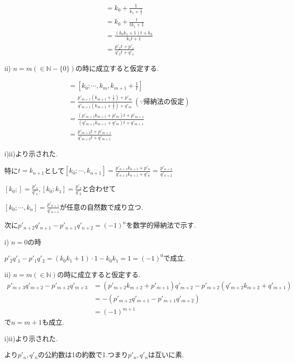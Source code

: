 \documentclass{jsarticle}
\begin{document}
       \begin{align*}
       [k_0;k_1,t]&=k_0+\frac{1}{k_1+\frac{1}{t}}\\
       &=k_0+\frac{t}{tk_1+1}\\
       &=\frac{(k_0k_1+1)t+k_0}{k_1t+1}\\
       &=\frac{p'_2t+p'_1}{q'_2t+q'_1}
       \end{align*}
       
       ii) $n=m(\in \mathbb{N}-\{0\})$の時に成立すると仮定する.
       
       \begin{align*}
       [k_0;\cdots ,k_{m+1},t]&=[k_0;\cdots ,k_{m},k_{m+1}+\frac{1}{t}]\\
       &=\frac{p'_{m+1}(k_{m+1}+\frac{1}{t})+p'_m}{q'_{m+1}(k_{m+1}+\frac{1}{t})+q'_m} \ (\because 帰納法の仮定)\\
       &=\frac{(p'_{m+1}k_{m+1}+p'_m)t+p'_{m+1}}{(q'_{m+1}k_{m+1}+q'_m)t+q'_{m+1}}\\
       &=\frac{p'_{m+2}t+p'_{m+1}}{q'_{m+2}t+q'_{m+1}}
       \end{align*}
       
       i)ii)より示された.
       
       特に$t=k_{n+1}$として$[k_0;\cdots ,k_{n+1}]=\frac{p'_{n+1}k_{n+1}+p'_n}{q'_{n+1}k_{n+1}+q'_n}=\frac{p'_{n+2}}{q'_{n+2}}$
       
       $[k_0;]=\frac{p'_1}{q'_1},[k_0;k_1]=\frac{p'_2}{q'_2}$と合わせて
       
       $[k_0;\cdots ,k_n]=\frac{p'_{n+1}}{q'_{n+1}}$が任意の自然数で成り立つ.
       
       次に$p'_{n+2}q'_{n+1}-p'_{n+1}q'_{n+2}=(-1)^n$を数学的帰納法で示す.
       
       i) $n=0$の時
       
       $p'_2q'_1-p'_1q'_2=(k_0k_1+1)\cdot 1-k_0k_1=1=(-1)^0$で成立.
       
       ii) $n=m(\in \mathbb{N})$の時に成立すると仮定する.
       \begin{align*}
       p'_{m+3}q'_{m+2}-p'_{m+2}q'_{m+3}&=(p'_{m+2}k_{m+2}+p'_{m+1})q'_{m+2}-p'_{m+2}(q'_{m+2}k_{m+2}+q'_{m+1})\\
       &=-(p'_{m+2}q'_{m+1}-p'_{m+1}q'_{m+2})\\
       &=(-1)^{m+1}
       \end{align*}
       で$n=m+1$も成立.
       
       i)ii)より示された.
       
       より$p'_n,q'_n$の公約数は1の約数で1.つまり$p'_n,q'_n$は互いに素.
       
\end{document}
